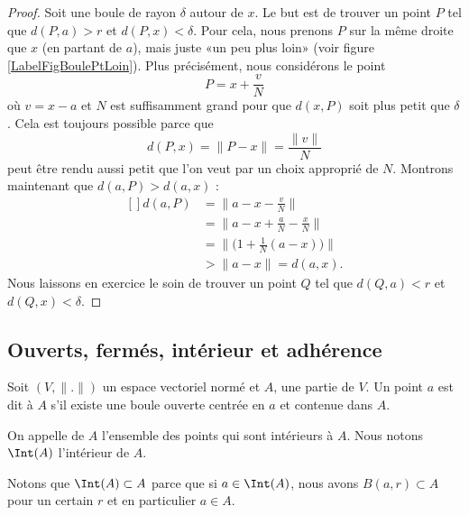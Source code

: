 \begin{proof}
	Soit une boule de rayon $\delta$ autour de $x$. Le but est de trouver un point $P$ tel que $d(P,a)>r$ et $d(P,x)<\delta$. Pour cela, nous prenons $P$ sur la même droite que $x$ (en partant de $a$), mais juste «un peu plus loin» (voir figure \ref{LabelFigBoulePtLoin}). Plus précisément, nous considérons le point
	\begin{equation}
		P=x+\frac{ v }{ N }
	\end{equation}
	où $v=x-a$ et $N$ est suffisamment grand pour que $d(x,P)$ soit plus petit que $\delta$. Cela est toujours possible parce que
	\begin{equation}
		d(P,x)=\| P-x \|=\frac{ \| v \| }{ N }
	\end{equation}
	peut être rendu aussi petit que l'on veut par un choix approprié de $N$. Montrons maintenant que $d(a,P)>d(a,x)$ :
	\begin{equation}
		\begin{aligned}[]
			d(a,P)&=\| a-x-\frac{ v }{ N }\| \\
			&=\| a-x+\frac{ a }{ N }-\frac{ x }{ N } \|\\
			&=\| \big( 1+\frac{1}{ N }(a-x) \big) \|\\
			&>\| a-x \|=d(a,x).
		\end{aligned}
	\end{equation}
	Nous laissons en exercice le soin de trouver un point $Q$ tel que $d(Q,a)<r$ et $d(Q,x)<\delta$.
\end{proof}


\subsection{Ouverts, fermés, intérieur et adhérence}

\begin{definition}
	Soit $(V,\| . \|)$ un espace vectoriel normé et $A$, une partie de $V$. Un point $a$ est dit  à $A$ s'il existe une boule ouverte centrée en $a$ et contenue dans $A$.

	On appelle  de $A$ l'ensemble des points qui sont intérieurs à $A$. Nous notons $\Int(A)$ l'intérieur de $A$.
\end{definition}
Notons que $\Int(A)\subset A$ parce que si $a\in\Int(A)$, nous avons $B(a,r)\subset A$ pour un certain $r$ et en particulier $a\in A$.

